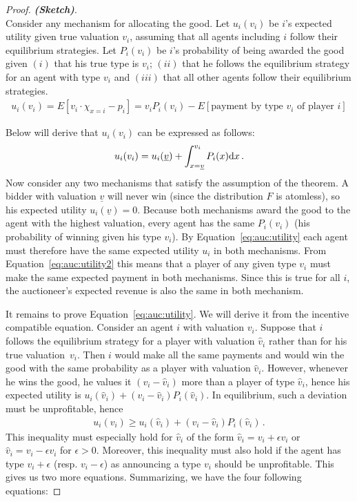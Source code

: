 \begin{proof} \textbf{\emph{(Sketch)}}.\\
Consider any mechanism for allocating the good. Let $u_i(v_i)$ be $i$'s expected utility given true valuation $v_i$, assuming that all agents including $i$ follow their equilibrium strategies. Let $P_i(v_i)$ be $i$'s probability of being awarded the good given $(i)$ that his true type is $v_i$; $(ii)$ that he follows the equilibrium strategy for an agent with type $v_i$ and $(iii)$ that all other agents follow their equilibrium strategies.
\begin{align}
 u_i(v_i) = E \left[v_i \cdot \chi_{x=i} - p_i \right] = v_i P_i(v_i) - E\left[\text{payment by type $v_i$ of player $i$} \right]  \label{eq:auc:utility2}
\end{align}

\noindent Below will derive that $u_i(v_i)$ can be expressed as follows:
\begin{align}
u_i(v_i) = u_i(\underline{v}) + \int_{x=\underline{v}}^{v_i} P_i(x) {\rm d}x\,. \label{eq:auc:utility}
\end{align}
Now consider any two mechanisms that satisfy the assumption of the theorem. A bidder with valuation $\underline{v}$ will never win (since the distribution $F$ is atomless), so his expected utility $u_i(\underline{v})=0$. Because both mechanisms award the good to the agent with the highest valuation, every agent has the same $P_i(v_i)$ (his probability of winning given his type $v_i$). By Equation~\eqref{eq:auc:utility} each agent must therefore have the same expected utility $u_i$ in both mechanisms. From Equation~\eqref{eq:auc:utility2} this means that a player of any given type $v_i$ must make the same expected payment in both mechanisms. Since this is true for all $i$, the auctioneer's expected revenue is also the same in both mechanism.

It remains to prove Equation~\eqref{eq:auc:utility}.  We will derive it from the incentive compatible equation. Consider an agent $i$ with valuation $v_i$. Suppose that $i$ follows the equilibrium strategy for a player with valuation $\hat{v}_i$ rather than for his true valuation~$v_i$. Then $i$ would make all the same payments and would win the good with the same probability as a player with valuation $\hat{v}_i$. However, whenever he wins the good, he values it $(v_i - \hat{v}_i)$ more than a player of type $\hat{v}_i$, hence his expected utility is $u_i(\hat{v}_i) + (v_i - \hat{v}_i)P_i(\hat{v}_i)$. In equilibrium, such a deviation must be unprofitable, hence
\begin{align*}
u_i(v_i) \geq u_i(\hat{v}_i) + (v_i - \hat{v}_i)P_i(\hat{v}_i)\,.
\end{align*}
This inequality must especially hold for $\hat{v}_i$ of the form $\hat{v}_i = v_i + \epsilon v_i$ or $\hat{v}_i = v_i - \epsilon v_i$ for $\epsilon > 0$.
Moreover, this inequality must also hold if the agent has type $v_i+\epsilon$ (resp. $v_i-\epsilon$) as announcing a type $v_i$ should be unprofitable. This gives us two more equations.  Summarizing, we have the four following equations:


\end{proof}
